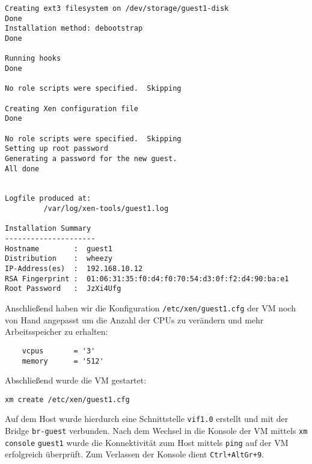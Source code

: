 \begin{verbatim}
Creating ext3 filesystem on /dev/storage/guest1-disk
Done                                              
Installation method: debootstrap
Done

Running hooks
Done

No role scripts were specified.  Skipping

Creating Xen configuration file
Done

No role scripts were specified.  Skipping
Setting up root password
Generating a password for the new guest.
All done


Logfile produced at:
         /var/log/xen-tools/guest1.log

Installation Summary
---------------------
Hostname        :  guest1
Distribution    :  wheezy
IP-Address(es)  :  192.168.10.12 
RSA Fingerprint :  01:06:31:35:f0:d4:f0:70:54:d3:0f:f2:d4:90:ba:e1
Root Password   :  JzXi4Ufg
\end{verbatim}

Anschließend haben wir die Konfiguration \verb#/etc/xen/guest1.cfg# der VM noch von Hand angepasst um die Anzahl der CPUs zu verändern und mehr Arbeitsspeicher zu erhalten:
\setupVerbatimOut
\begin{verbatim}
    vcpus       = '3'
    memory      = '512'
\end{verbatim}

Abschließend wurde die VM gestartet:
\begin{verbatim}
xm create /etc/xen/guest1.cfg
\end{verbatim}

Auf dem Host wurde hierdurch eine Schnittstelle \verb#vif1.0# erstellt und mit der Bridge \verb#br-guest# verbunden. Nach dem Wechsel in die Konsole der VM mittels \verb#xm# \verb#console# \verb#guest1# wurde die Konnektivität zum Host mittels \verb#ping# auf der VM erfolgreich überprüft. Zum Verlassen der Konsole dient \verb#Ctrl+AltGr+9#.


